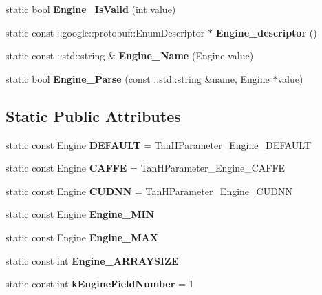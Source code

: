 \begin{DoxyCompactItemize}
\item 
\mbox{\label{classcaffe_1_1_tan_h_parameter_a0563ba905800a4f4df64de7760dd0c97}} 
static bool {\bfseries Engine\+\_\+\+Is\+Valid} (int value)
\item 
\mbox{\label{classcaffe_1_1_tan_h_parameter_ada335064ab8d07aed7c254cc20544399}} 
static const \+::google\+::protobuf\+::\+Enum\+Descriptor $\ast$ {\bfseries Engine\+\_\+descriptor} ()
\item 
\mbox{\label{classcaffe_1_1_tan_h_parameter_a70c86f00fd3b7f0a3b71e3a9979ed606}} 
static const \+::std\+::string \& {\bfseries Engine\+\_\+\+Name} (Engine value)
\item 
\mbox{\label{classcaffe_1_1_tan_h_parameter_a6c234f43ee74fde5881e700e3e101ab7}} 
static bool {\bfseries Engine\+\_\+\+Parse} (const \+::std\+::string \&name, Engine $\ast$value)
\end{DoxyCompactItemize}
\subsection*{Static Public Attributes}
\begin{DoxyCompactItemize}
\item 
\mbox{\label{classcaffe_1_1_tan_h_parameter_abba7a2092814e48d63789c9a090db836}} 
static const Engine {\bfseries D\+E\+F\+A\+U\+LT} = Tan\+H\+Parameter\+\_\+\+Engine\+\_\+\+D\+E\+F\+A\+U\+LT
\item 
\mbox{\label{classcaffe_1_1_tan_h_parameter_a61ee3a6db7a62ae84703024fed248d8f}} 
static const Engine {\bfseries C\+A\+F\+FE} = Tan\+H\+Parameter\+\_\+\+Engine\+\_\+\+C\+A\+F\+FE
\item 
\mbox{\label{classcaffe_1_1_tan_h_parameter_a0baa99c869d6301fee293978ccf7ba92}} 
static const Engine {\bfseries C\+U\+D\+NN} = Tan\+H\+Parameter\+\_\+\+Engine\+\_\+\+C\+U\+D\+NN
\item 
static const Engine {\bfseries Engine\+\_\+\+M\+IN}
\item 
static const Engine {\bfseries Engine\+\_\+\+M\+AX}
\item 
static const int {\bfseries Engine\+\_\+\+A\+R\+R\+A\+Y\+S\+I\+ZE}
\item 
\mbox{\label{classcaffe_1_1_tan_h_parameter_a11a9b9051b6de59221c36788c65eafe9}} 
static const int {\bfseries k\+Engine\+Field\+Number} = 1
\end{DoxyCompactItemize}
